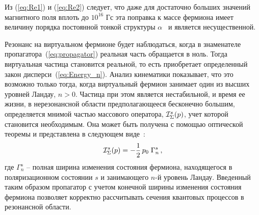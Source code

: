 Из (\ref{eq:Re1}) и (\ref{eq:Re2}) следует, что даже для достаточно больших значений магнитного поля вплоть до $10^{16}$ Гс эта поправка к массе фермиона имеет величину порядка постоянной тонкой структуры $\alpha$~\cite{Kuznetsov:2003,Sokolov:1986} и является несущественной.
 
Резонанс на виртуальном фермионе будет наблюдаться, когда в знаменателе пропагатора~(\ref{eq:propagator}) реальная часть обращается в ноль. Тогда виртуальная частица становится реальной, то есть приобретает определенный закон дисперси~(\ref{eq:Energy_n}). Анализ кинематики показывает, что это возможно только тогда, когда виртуальный фермион занимает один из высших уровней Ландау, $n > 0$. Частица при этом является нестабильной, и время ее жизни, в нерезонансной области предполагающееся бесконечно большим, определяется мнимой частью массового оператора,  ${\cal I}^{s}_\Sigma (p)$, учет которой становится необходимым. Она может быть получена с помощью оптической теоремы и представлена в следующем виде~\cite{Weldon:1982, Zhukovski:1994}:
%
\begin{eqnarray}
{\cal I}^{s}_\Sigma (p) = - \frac{1}{2}\, p_0 \; \Gamma_n^{s} \, 
,
\label{eq:I_Sigma}
\end{eqnarray}
\noindent где $\Gamma_n^{s}$ -- полная ширина изменения состояния фермиона, 
находящегося 
в поляризационном состоянии $s$ и занимающего  $n$-й уровень Ландау.  Введенный 
таким образом пропагатор с учетом конечной ширины изменения состояния фермиона  
позволяет корректно рассчитывать сечения квантовых процессов в резонансной 
области.